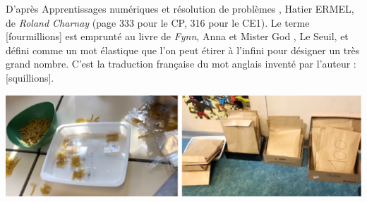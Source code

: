 \begin{exercice*}

D'après \og Apprentissages numériques et résolution de problèmes \fg, Hatier ERMEL, de {\it Roland Charnay} (page 333 pour le CP, 316 pour le CE1). Le terme [fourmillions] est emprunté au livre de {\it Fynn}, \og Anna et Mister God \fg, Le Seuil, et défini comme un mot élastique que l'on peut étirer à l'infini pour désigner un très grand nombre. C'est la traduction française du mot anglais inventé par l'auteur : [squillions]. \\

\begin{center}
   \includegraphics[width=15cm]{Nombres_et_calculs_did/Images/Num1_activites_fourmillions}
\end{center}


\end{exercice*}
